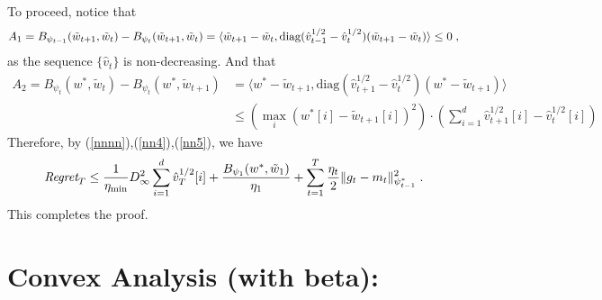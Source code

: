 \documentclass[11pt]{article}
\makeatletter
\renewenvironment{proof}[1][\proofname]{%
   \par\pushQED{\qed}\normalfont%
   \topsep6\p@\@plus6\p@\relax
   \trivlist\item[\hskip\labelsep\bfseries#1]%
   \ignorespaces
}{%
   \popQED\endtrivlist\@endpefalse
}
\theoremstyle{k}
\makeatother
\begin{document}
\begin{proof}
To proceed, notice that
\begin{equation} \label{nn5}
\begin{aligned}
A_1 =  B_{\psi_{t-1}}(\tilde{w}_{t+1}, \tilde{w}_{t}) - B_{\psi_t}(\tilde{w}_{t+1}, \tilde{w}_{t})  = \langle \tilde{w}_{t+1} - \tilde{w}_{t} , \text{diag}(\hat{v}_{t-1}^{1/2} -\hat{v}_t^{1/2} ) ( \tilde{w}_{t+1}- \tilde{w}_{t} ) \rangle \leq 0 \;,
\end{aligned}
\end{equation}
as the sequence $\{\hat{v}_t\}$ is non-decreasing. And that
\begin{equation}  \label{nn4}
\begin{aligned}
A_2 = B_{\psi_t}( w^*, \tilde{w}_{t}) -B_{\psi_t}(w^*,  \tilde{w}_{t+1} )  &= \langle w^* - \tilde{w}_{t+1}  , \text{diag}(\hat{v}_{t+1}^{1/2} -\hat{v}_t^{1/2} ) ( w^* - \tilde{w}_{t+1}  ) \rangle\\
  & \leq ( \max_i (w^*[i] -  \tilde{w}_{t+1} [i] )^2  )\cdot ( \sum_{i=1}^d \hat{v}_{t+1}^{1/2}[i] -\hat{v}_t^{1/2}[i] )
\end{aligned}
\end{equation}
Therefore, by (\ref{nnnn}),(\ref{nn4}),(\ref{nn5}), we have
\begin{equation}\notag
\begin{aligned}
 \text{\it Regret}_T \leq \frac{1}{\eta_{\min}} D_{\infty}^2 \sum_{i=1}^d \hat{v}_{T}^{1/2}[i] + \frac{ B_{\psi_1}(w^*, \tilde{w}_{1})}{\eta_1}
+ \sum_{t=1}^T\frac{\eta_t}{2} \| g_t - m_t  \|_{\psi_{t-1}^*}^2 \;.
\end{aligned}
\end{equation}
This completes the proof.

\end{proof}



\newpage
\section{Convex Analysis (with beta):}
\end{document}
